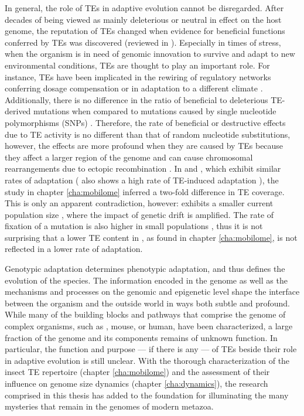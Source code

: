 In general, the role of TEs in adaptive evolution cannot be disregarded.
After decades of being viewed as mainly deleterious or neutral in effect
on the host genome, the reputation of TEs changed when evidence for
beneficial functions conferred by TEs was discovered (reviewed in
\citet{Oliver2012, Fedoroff2013}). Especially in times of stress, when
the organism is in need of genomic innovation to survive and adapt to
new environmental conditions, TEs are thought to play an important role.
For instance, TEs have been implicated in the rewiring of regulatory
networks conferring dosage compensation \citep{Ellison2013, Chuong2016}
or in adaptation to a different climate \citep{Gonzalez2010}.
Additionally, there is no difference in the ratio of beneficial to
deleterious TE-derived mutations when compared to mutations caused by
single nucleotide polymorphisms (SNPs) \citep{Akagi2013, Barron2014}.
Therefore, the rate of beneficial or destructive effects due to TE
activity is no different than that of random nucleotide substitutions,
however, the effects are more profound when they are caused by TEs
because they affect a larger region of the genome and can cause
chromosomal rearrangements due to ectopic recombination \citep{Gray2000,
Fiston-Lavier2007}. In  and , which exhibit similar rates of adaptation \citep{Bachtrog2008}
( also shows a high rate of TE-induced
adaptation \citep{Gonzalez2008}), the study in chapter
\ref{cha:mobilome} inferred a two-fold difference in TE coverage. This
is only an apparent contradiction, however: 
exhibits a smaller current population size \citep{Bachtrog2008}, where
the impact of genetic drift is amplified. The rate of fixation of a
mutation is also higher in small populations \citep{Kimura1969}, thus it
is not surprising that a lower TE content in , as
found in chapter \ref{cha:mobilome}, is not reflected in a lower rate of
adaptation.

Genotypic adaptation determines phenotypic adaptation, and thus defines
the evolution of the species.  The information encoded in the genome as
well as the mechanisms and processes on the genomic and epigenetic level
shape the interface between the organism and the outside world in ways
both subtle and profound.  While many of the building blocks and
pathways that comprise the genome of complex organisms, such as
, mouse, or human, have been characterized, a large
fraction of the genome and its components remains of unknown function.
In particular, the function and purpose --- if there is any --- of TEs
beside their role in adaptive evolution is still unclear.  With the
thorough characterization of the insect TE repertoire (chapter
\ref{cha:mobilome}) and the assessment of their influence on genome size
dynamics (chapter \ref{cha:dynamics}), the research comprised in this
thesis has added to the foundation for illuminating the many mysteries
that remain in the genomes of modern metazoa.



